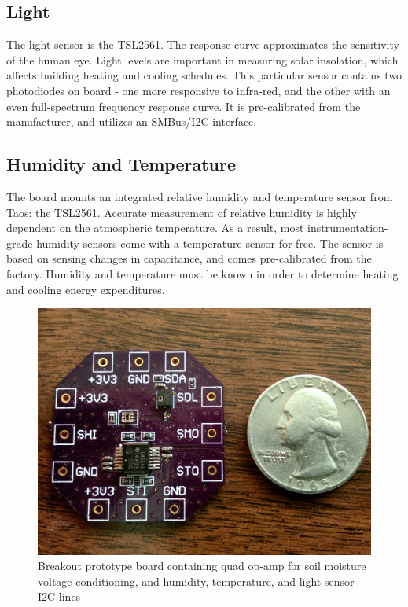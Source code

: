\begin{table}[h]
\caption{Sensor specifications}
\label{sensor-specs}
\end{table}

\subsection{Light}

The light sensor is the TSL2561. The response curve approximates the sensitivity of the human eye. Light levels are important in measuring solar insolation, which affects building heating and cooling schedules. This particular sensor contains two photodiodes on board - one more responsive to infra-red, and the other with an even full-spectrum frequency response curve. It is pre-calibrated from the manufacturer, and utilizes an SMBus/I2C interface.

\subsection{Humidity and Temperature}

The board mounts an integrated relative humidity and temperature sensor from Taos: the TSL2561. Accurate measurement of relative humidity is highly dependent on the atmospheric temperature. As a result, most instrumentation-grade humidity sensors come with a temperature sensor for free. The sensor is based on sensing changes in capacitance, and comes pre-calibrated from the factory. Humidity and temperature must be known in order to determine heating and cooling energy expenditures.

\begin{figure}[h]
\centering
\includegraphics[width=0.3\linewidth]{images/sbrk-proto}
\caption[Development breakout]{Breakout prototype board containing quad op-amp for soil moisture voltage conditioning, and humidity, temperature, and light sensor I2C lines}
\label{fig:sbrk-proto}
\end{figure}

